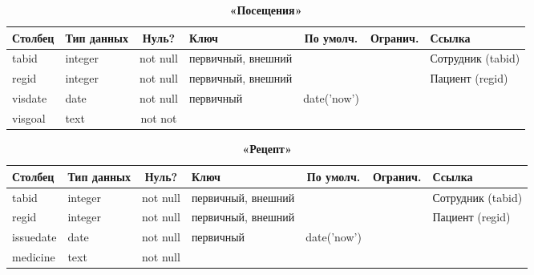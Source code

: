 \documentclass[14pt,a4paper,russian]{extreport}
\begin{document}
\begin{table}[h]
    \caption{ }
    \begin{subtable}[t]{\textwidth}
        \caption{\textbf{«Посещения»}}
    \begin{tabularx}{\textwidth}{| X | X | c | X | c | c | X |}
        \hline
        \textbf{Столбец} & \textbf{Тип данных} & \textbf{Нуль?} & \textbf{Ключ} & \textbf{По умолч.} & \textbf{Огранич.} & \textbf{Ссылка} \\ \hline
            tabid & integer & not null & первичный, внешний & & & Сотрудник (tabid) \\ \hline

            regid & integer & not null & первичный, внешний & & & Пациент (regid)\\ \hline
            visdate & date & not null & первичный & date('now') & & \\ \hline
            visgoal & text & not not & & & & \\ \hline
    \end{tabularx}
    \end{subtable}
    \label{table:visit}
\end{table}

\begin{table}[h]
    \caption{ } 
    \begin{subtable}[t]{\textwidth}
        \caption{\textbf{«Рецепт»}}
    \begin{tabularx}{\textwidth}{| X | X | c | X | c | c | X |}
        \hline
        \textbf{Столбец} & \textbf{Тип данных} & \textbf{Нуль?} & \textbf{Ключ} & \textbf{По
        умолч.} & \textbf{Огранич.} & \textbf{Ссылка} \\ \hline
            tabid & integer & not null & первичный, внешний & & & Сотрудник (tabid) \\ \hline

            regid & integer & not null & первичный, внешний & & & Пациент (regid)\\ \hline
            issuedate & date & not null & первичный & date('now') & & \\ \hline
        medicine & text & not null & & & & \\ \hline
    \end{tabularx}
    \end{subtable}
    \label{table:receipt}
\end{table}
\end{document}
